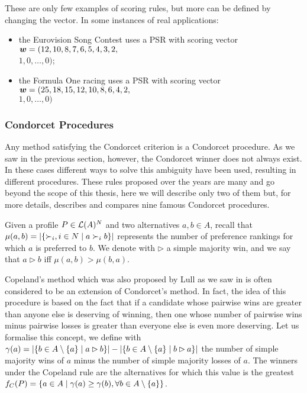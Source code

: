 \noindent These are only few examples of scoring rules, but more can be defined by changing the vector. In some instances of real applications: 
\begin{itemize}
	\item the Eurovision Song Contest uses a \acs{PSR} with scoring vector $\bm{w}=(12,10,8,7,6,5,4,3,2,$ \\$1,0, \dots,0)$;
	\item the Formula One racing uses a \acs{PSR} with scoring vector
	$\bm{w}=(25,18,15,12,10,8,6,4,2,$\\$1,0,\dots,0)$
\end{itemize}




\subsubsection*{Condorcet Procedures}
Any method satisfying the Condorcet criterion is a Condorcet procedure. As we saw in the previous section, however, the Condorcet winner does not always exist. In these cases different ways to solve this ambiguity have been used, resulting in different procedures. These rules proposed over the years are many and go beyond the scope of this thesis, here we will describe only two of them but, for more details, \citet{Fishburn1977} describes and compares nine famous Condorcet procedures.

Given a profile $P\in\mathcal{L}(A)^{N}$ and two alternatives $a,b\in A$, recall that $\mu(a,b)=|\{\mathop{\prefi}, i \in N \suchthat a\prefi b\}|$ represents the number of preference rankings for which $a$ is preferred to $b$.
We denote with $\rhd$ a simple majority win, and we say that $a \rhd b$ iff $\mu(a,b)>\mu(b,a)$.

\begin{indented}[Copeland]
	Copeland's method \textemdash which was also proposed by Lull as we saw in  \textemdash is often considered to be an extension of Condorcet's method. 
	In fact, the idea of this procedure is based on the fact that if a candidate whose pairwise wins are greater than anyone else is deserving of winning, then one whose number of pairwise wins minus pairwise losses is greater than everyone else is even more deserving.
	Let us formalise this concept, we define with $\gamma(a)=|\{b \in A\setminus \{a\} \suchthat a \rhd b\}|- |\{b \in A\setminus \{a\} \suchthat b \rhd a\}|$ the number of simple majority wins of $a$ minus the number of simple majority losses of $a$.
	The winners under the Copeland rule are the alternatives for which this value is the greatest $f_{C}(P)=\{a\in A \suchthat \gamma(a)\geq \gamma(b), \forall b \in A \setminus\{a\} \}$.
\end{indented}

